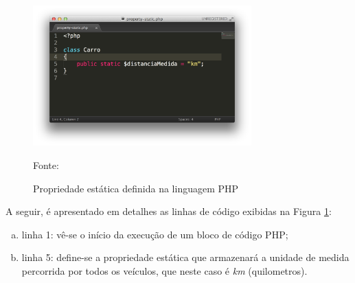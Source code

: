 \begin{figure}[h!tb]
	\caption{Propriedade estática definida na linguagem PHP}
	\label{fig:propriedadeEstatica}

	\centering
	\includegraphics[width=0.75\textwidth]{images/property-static.png}

	\centering
	\footnotesize Fonte: \fonteOAutor
\end{figure}

\FloatBarrier 	%

A seguir, é apresentado em detalhes as linhas de código exibidas na Figura 
\ref{fig:propriedadeEstatica}:

\begin{enumerate}[a)]
    \item linha 1: vê-se o início da execução de um bloco de código PHP;
    \item linha 5: define-se a propriedade estática que armazenará a unidade de
    medida percorrida por todos os veículos, que neste caso é \textit{km}
    (quilometros).
\end{enumerate}
